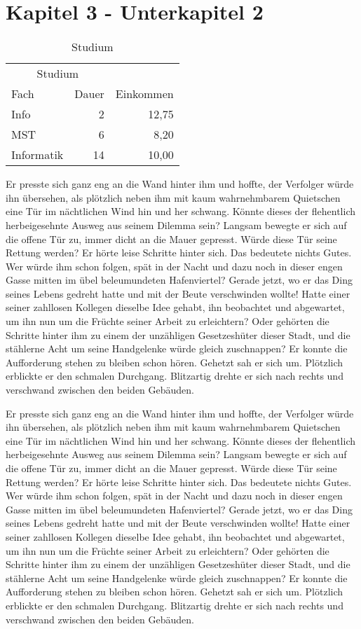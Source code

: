 \section{Kapitel 3 - Unterkapitel 2}
\label{Kapitel_3_-_Unterkapitel_2}
%
\begin{table}[b]
\centering
\begin{tabular}{lrr}
\toprule
\multicolumn{2}{c}{Studium}\\ \cmidrule{1-2}
Fach & Dauer & Einkommen\\
\midrule
Info & 2 & 12,75 \\ \addlinespace
MST & 6 & 8,20 \\ \addlinespace
Informatik & 14 & 10,00\\
\bottomrule
\end{tabular}
\caption{Studium}
\label{table:Studium}
\end{table}
%
Er presste sich ganz eng an die Wand hinter ihm und hoffte, der
Verfolger würde ihn übersehen, als plötzlich neben ihm mit kaum
wahrnehmbarem Quietschen eine Tür im nächtlichen Wind hin und her
schwang. Könnte dieses der flehentlich herbeigesehnte Ausweg aus
seinem Dilemma sein? Langsam bewegte er sich auf die offene Tür
zu, immer dicht an die Mauer gepresst. Würde diese Tür seine
Rettung werden? Er hörte leise Schritte hinter sich. Das bedeutete
nichts Gutes. Wer würde ihm schon folgen, spät in der Nacht und
dazu noch in dieser engen Gasse mitten im übel beleumundeten
Hafenviertel? Gerade jetzt, wo er das Ding seines Lebens gedreht
hatte und mit der Beute verschwinden wollte! Hatte einer seiner
zahllosen Kollegen dieselbe Idee gehabt, ihn beobachtet und
abgewartet, um ihn nun um die Früchte seiner Arbeit zu
erleichtern? Oder gehörten die Schritte hinter ihm zu einem der
unzähligen Gesetzeshüter dieser Stadt, und die stählerne Acht um
seine Handgelenke würde gleich zuschnappen? Er konnte die
Aufforderung stehen zu bleiben schon hören. Gehetzt sah er sich
um. Plötzlich erblickte er den schmalen Durchgang. Blitzartig
drehte er sich nach rechts und verschwand zwischen den beiden
Gebäuden.


Er presste sich ganz eng an die Wand hinter ihm und hoffte, der
Verfolger würde ihn übersehen, als plötzlich neben ihm mit kaum
wahrnehmbarem Quietschen eine Tür im nächtlichen Wind hin und her
schwang. Könnte dieses der flehentlich herbeigesehnte Ausweg aus
seinem Dilemma sein? Langsam bewegte er sich auf die offene Tür
zu, immer dicht an die Mauer gepresst. Würde diese Tür seine
Rettung werden? Er hörte leise Schritte hinter sich. Das bedeutete
nichts Gutes. Wer würde ihm schon folgen, spät in der Nacht und
dazu noch in dieser engen Gasse mitten im übel beleumundeten
Hafenviertel? Gerade jetzt, wo er das Ding seines Lebens gedreht
hatte und mit der Beute verschwinden wollte! Hatte einer seiner
zahllosen Kollegen dieselbe Idee gehabt, ihn beobachtet und
abgewartet, um ihn nun um die Früchte seiner Arbeit zu
erleichtern? Oder gehörten die Schritte hinter ihm zu einem der
unzähligen Gesetzeshüter dieser Stadt, und die stählerne Acht um
seine Handgelenke würde gleich zuschnappen? Er konnte die
Aufforderung stehen zu bleiben schon hören. Gehetzt sah er sich
um. Plötzlich erblickte er den schmalen Durchgang. Blitzartig
drehte er sich nach rechts und verschwand zwischen den beiden
Gebäuden.

